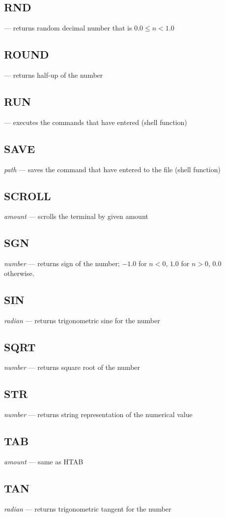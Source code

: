 \subsection{RND} --- returns random decimal number that is $ 0.0 \leq n < 1.0 $
\subsection{ROUND} --- returns half-up of the number
\subsection{RUN} --- executes the commands that have entered (shell function)
\subsection{SAVE} \emph{path} --- saves the command that have entered to the file (shell function)
\subsection{SCROLL} \emph{amount} --- scrolls the terminal by given amount
\subsection{SGN} \emph{number} --- returns sign of the number; $ -1.0 $ for $ n < 0 $, $ 1.0 $ for $ n > 0 $, $ 0.0 $ otherwise.
\subsection{SIN} \emph{radian} --- returns trigonometric sine for the number
\subsection{SQRT} \emph{number} --- returns square root of the number
\subsection{STR} \emph{number} --- returns string representation of the numerical value
\subsection{TAB} \emph{amount} --- same as HTAB
\subsection{TAN} \emph{radian} --- returns trigonometric tangent for the number
